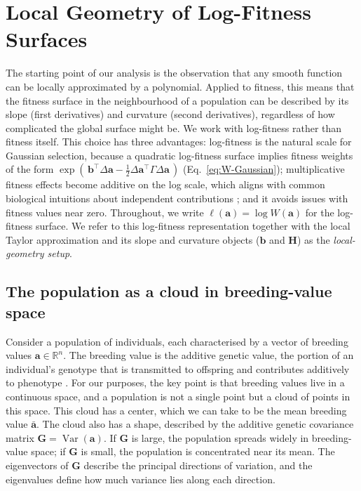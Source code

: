 \documentclass[9pt,twocolumn,twoside,lineno]{gsajnl}
\newcommand{\vect}[1]{\boldsymbol{#1}}
\newcommand{\mat}[1]{\mathbf{#1}}
\newcommand{\RR}{\ensuremath{\mathbb{R}}\xspace}
\newcommand{\Var}{\ensuremath{\operatorname{Var}}\xspace}
\begin{document}
\section{Local Geometry of Log-Fitness Surfaces}
\label{sec:geometry}

The starting point of our analysis is the observation that any smooth function can be locally approximated by a polynomial. Applied to fitness, this means that the fitness surface in the neighbourhood of a population can be described by its slope (first derivatives) and curvature (second derivatives), regardless of how complicated the global surface might be. We work with log-fitness rather than fitness itself. This choice has three advantages: log-fitness is the natural scale for Gaussian selection, because a quadratic log-fitness surface implies fitness weights of the form $\exp(\,\vect{b}^\top\Delta\vect{a}-\tfrac{1}{2}\Delta\vect{a}^\top\Gamma\Delta\vect{a}\,)$ (Eq.~\eqref{eq:W-Gaussian}); multiplicative fitness effects become additive on the log scale, which aligns with common biological intuitions about independent contributions \citep{Rice2004}; and it avoids issues with fitness values near zero. Throughout, we write $\ell(\vect{a}) = \log W(\vect{a})$ for the log-fitness surface. We refer to this log-fitness representation together with the local Taylor approximation and its slope and curvature objects ($\vect{b}$ and $\mat{H}$) as the \emph{local-geometry setup}.

\subsection{The population as a cloud in breeding-value space}

Consider a population of individuals, each characterised by a vector of breeding values $\vect{a} \in \RR^n$. The breeding value is the additive genetic value, the portion of an individual's genotype that is transmitted to offspring and contributes additively to phenotype \citep{Fisher1918, Lynch1998}. For our purposes, the key point is that breeding values live in a continuous space, and a population is not a single point but a cloud of points in this space. This cloud has a center, which we can take to be the mean breeding value $\bar{\vect{a}}$. The cloud also has a shape, described by the additive genetic covariance matrix $\mat{G} = \Var(\vect{a})$. If $\mat{G}$ is large, the population spreads widely in breeding-value space; if $\mat{G}$ is small, the population is concentrated near its mean. The eigenvectors of $\mat{G}$ describe the principal directions of variation, and the eigenvalues define how much variance lies along each direction.
\end{document}
